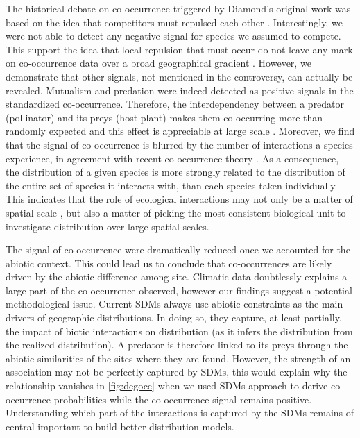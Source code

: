 The historical debate on co-occurrence triggered by Diamond's original
work was based on the idea that competitors must repulsed each other
\citep{Diamond1975}. Interestingly, we were not able to detect any
negative signal for species we assumed to compete. This support the idea
that local repulsion that must occur do not leave any mark on
co-occurrence data over a broad geographical gradient
\citep{Araujo2014}. However, we demonstrate that other signals, not
mentioned in the controversy, can actually be revealed. Mutualism and
predation were indeed detected as positive signals in the standardized
co-occurrence. Therefore, the interdependency between a predator
(pollinator) and its preys (host plant) makes them co-occurring more
than randomly expected and this effect is appreciable at large scale
\citep{Araujo2014}. Moreover, we find that the signal of co-occurrence
is blurred by the number of interactions a species experience, in
agreement with recent co-occurrence theory \citep{Cazelles2016}. As a
consequence, the distribution of a given species is more strongly
related to the distribution of the entire set of species it interacts
with, than each species taken individually. This indicates that the role
of ecological interactions may not only be a matter of spatial scale
\citep{McGill2010}, but also a matter of picking the most consistent
biological unit to investigate distribution over large spatial scales.

The signal of co-occurrence were dramatically reduced once we accounted
for the abiotic context. This could lead us to conclude that
co-occurrences are likely driven by the abiotic difference among site.
Climatic data doubtlessly explains a large part of the co-occurrence
observed, however our findings suggest a potential methodological issue.
Current SDMs always use abiotic constraints as the main drivers of
geographic distributions. In doing so, they capture, at least partially,
the impact of biotic interactions on distribution (as it infers the
distribution from the realized distribution). A predator is therefore
linked to its preys through the abiotic similarities of the sites where
they are found. However, the strength of an association may not be
perfectly captured by SDMs, this would explain why the relationship
vanishes in \ref{fig:degocc} when we used SDMs approach to derive
co-occurrence probabilities while the co-occurrence signal remains
positive. Understanding which part of the interactions is captured by
the SDMs remains of central important to build better distribution
models.

